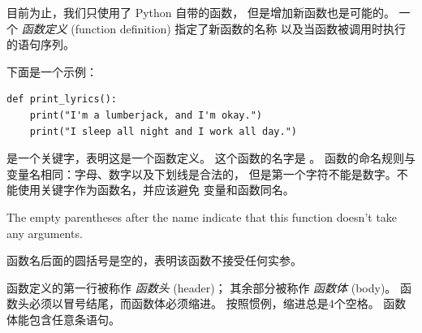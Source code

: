 目前为止，我们只使用了 Python 自带的函数， 但是增加新函数也是可能的。
一个 {\em 函数定义} (function definition) 指定了新函数的名称
以及当函数被调用时执行的语句序列。
    
    


下面是一个示例：


\begin{lstlisting}
def print_lyrics():
    print("I'm a lumberjack, and I'm okay.")
    print("I sleep all night and I work all day.")
\end{lstlisting}

%

 是一个关键字，表明这是一个函数定义。
这个函数的名字是 。
函数的命名规则与变量名相同：字母、数字以及下划线是合法的，
但是第一个字符不能是数字。不能使用关键字作为函数名，并应该避免
变量和函数同名。
    

The empty parentheses after the name indicate that this function
doesn't take any arguments.

函数名后面的圆括号是空的，表明该函数不接受任何实参。
  
    


函数定义的第一行被称作 {\em 函数头} (header)； 其余部分被称作 {\em 函数体} (body)。 函数头必须以冒号结尾，而函数体必须缩进。 按照惯例，缩进总是4个空格。 函数体能包含任意条语句。


